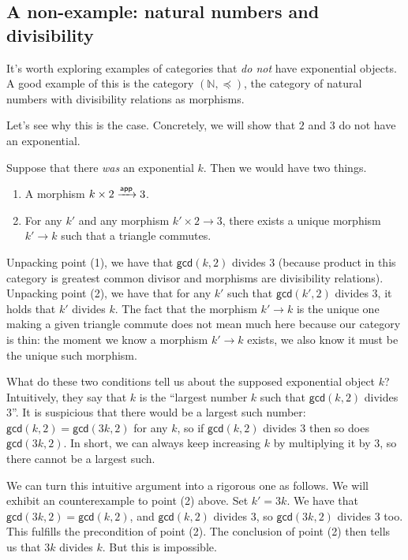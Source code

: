 \subsection{A non-example: natural numbers and divisibility}
It's worth exploring examples of categories that \emph{do not}
have exponential objects. A good example of this 
is the category $(\mathbb{N}, \preceq)$, the category of 
natural numbers with divisibility relations as morphisms.

Let's see why this is the case.
Concretely, we will show that \(2\) and \(3\)
do not have an exponential.

Suppose that there \emph{was} an exponential \(k\).
Then we would have two things.
\begin{enumerate}
\item A morphism \(k \times 2 \xrightarrow{\mathsf{app}} 3\).
\item For any \(k'\)
and any morphism \(k' \times 2 \to 3\),
there exists a unique morphism \(k' \to k\) such that
a triangle commutes.
\end{enumerate}
Unpacking point (1),
we have that \(\mathsf{gcd}(k,2)\) divides \(3\) (because product in this
category is greatest common divisor and morphisms are divisibility relations).
Unpacking point (2), we have that for any \(k'\) such that \(\mathsf{gcd}(k',2)\) divides \(3\),
it holds that \(k'\) divides \(k\). The fact that the morphism \(k' \to k\)
is the unique one making a given triangle commute does not mean much here because our category
is thin: the moment we know a morphism \(k' \to k\) exists, we also know it must be the unique
such morphism.

What do these two conditions tell us about the supposed exponential object \(k\)?
Intuitively, they say that \(k\) is the ``largest number \(k\) such that \(\mathsf{gcd}(k,2)\) divides \(3\)''.
It is suspicious that there would be a largest such number: \(\mathsf{gcd}(k,2) = \mathsf{gcd}(3k,2)\)
for any \(k\), so if \(\mathsf{gcd}(k,2)\) divides \(3\) then so does \(\mathsf{gcd}(3k,2)\).
In short, we can always keep increasing \(k\) by multiplying it by \(3\), so there cannot be a largest such.

We can turn this intuitive argument into a rigorous one as follows.
We will exhibit an counterexample to point (2) above. Set \(k' = 3k\).
We have that \(\mathsf{gcd}(3k,2) = \mathsf{gcd}(k,2)\), and \(\mathsf{gcd}(k,2)\) divides \(3\),
so \(\mathsf{gcd}(3k,2)\) divides \(3\) too. This fulfills the precondition of point (2).
The conclusion of point (2) then tells us that
\(3k\) divides \(k\). But this is impossible.

